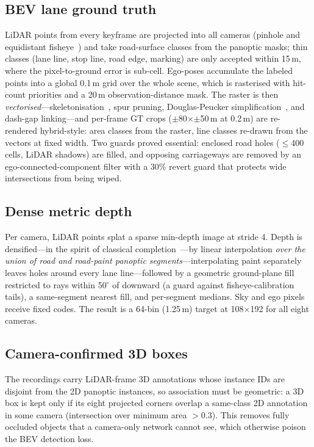 \documentclass[10pt,twocolumn]{article}
\begin{document}
\subsection{BEV lane ground truth}
LiDAR points from every keyframe are projected into all cameras (pinhole and
equidistant fisheye~\citep{kannala2006generic}) and take road-surface classes from the panoptic masks;
thin classes (lane line, stop line, road edge, marking) are only accepted
within 15\,m, where the pixel-to-ground error is sub-cell. Ego-poses
accumulate the labeled points into a global 0.1\,m grid over the whole scene,
which is rasterised with hit-count priorities and a 20\,m observation-distance
mask. The raster is then \emph{vectorised}---skeletonisation~\citep{zhang1984thinning}, spur pruning,
Douglas-Peucker simplification~\citep{douglas1973dp}, and dash-gap linking---and per-frame GT crops
($\pm$80$\times$$\pm$50\,m at 0.2\,m) are re-rendered hybrid-style: area
classes from the raster, line classes re-drawn from the vectors at fixed
width. Two guards proved essential: enclosed road holes ($\le$400 cells,
LiDAR shadows) are filled, and opposing carriageways are removed by an
ego-connected-component filter with a 30\% revert guard that protects wide
intersections from being wiped.

\subsection{Dense metric depth}
Per camera, LiDAR points splat a sparse min-depth image at stride 4. Depth is
densified---in the spirit of classical completion~\citep{ku2018ipbasic,ma2018sparsetodense}---by linear interpolation \emph{over the union of road and
road-paint panoptic segments}---interpolating paint separately leaves holes
around every lane line---followed by a geometric ground-plane fill restricted
to rays within 50$^\circ$ of downward (a guard against fisheye-calibration
tails), a same-segment nearest fill, and per-segment medians. Sky and ego
pixels receive fixed codes. The result is a 64-bin (1.25\,m) target at
108$\times$192 for all eight cameras.

\subsection{Camera-confirmed 3D boxes}
The recordings carry LiDAR-frame 3D annotations whose instance IDs are
disjoint from the 2D panoptic instances, so association must be geometric: a
3D box is kept only if its eight projected corners overlap a same-class 2D
annotation in some camera (intersection over minimum area $>0.3$). This
removes fully occluded objects that a camera-only network cannot see,
which otherwise poison the BEV detection loss.
\end{document}
